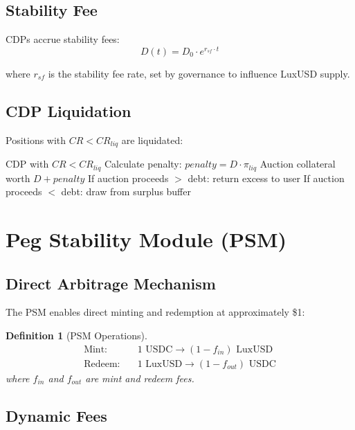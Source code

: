\documentclass[11pt,a4paper]{article}
\newtheorem{definition}[theorem]{Definition}
\begin{document}
\subsection{Stability Fee}

CDPs accrue stability fees:
\begin{equation}
    D(t) = D_0 \cdot e^{r_{sf} \cdot t}
\end{equation}

where $r_{sf}$ is the stability fee rate, set by governance to influence LuxUSD supply.

\subsection{CDP Liquidation}

Positions with $CR < CR_{liq}$ are liquidated:

\begin{algorithm}
\caption{CDP Liquidation}
\begin{algorithmic}[1]
\Require CDP with $CR < CR_{liq}$
\State Calculate penalty: $penalty = D \cdot \pi_{liq}$
\State Auction collateral worth $D + penalty$
\State If auction proceeds $>$ debt: return excess to user
\State If auction proceeds $<$ debt: draw from surplus buffer
\end{algorithmic}
\end{algorithm}

\section{Peg Stability Module (PSM)}

\subsection{Direct Arbitrage Mechanism}

The PSM enables direct minting and redemption at approximately \$1:

\begin{definition}[PSM Operations]
\begin{align}
    \text{Mint}: & \quad 1 \text{ USDC} \to (1 - f_{in}) \text{ LuxUSD} \\
    \text{Redeem}: & \quad 1 \text{ LuxUSD} \to (1 - f_{out}) \text{ USDC}
\end{align}
where $f_{in}$ and $f_{out}$ are mint and redeem fees.
\end{definition}

\subsection{Dynamic Fees}
\end{document}
